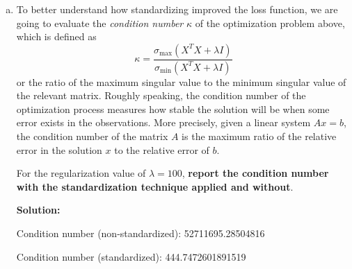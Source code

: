 \documentclass{article}
\newenvironment{solution}{\color{blue} \smallskip \textbf{Solution:}}{}
\begin{document}
\begin{enumerate}[(a)]
\begin{solution}
  Explanation: The regularization parameter \(\lambda\) plays a crucial role in controlling the trade-off between bias and variance in ridge regression. At low values of \(\lambda\), the model fits the training data more closely, resulting in low bias but high variance, as it becomes prone to overfitting by capturing noise in the data. As \(\lambda\) increases, the regularization becomes stronger, which constrains the model coefficients, simplifying the model. This helps reduce variance by preventing overfitting, but at the cost of increasing bias, as the model may become too simple to capture the underlying patterns in the data. At very high values of \(\lambda\), the model can become too rigid, leading to high bias and low variance, resulting in underfitting, where the model fails to capture important trends. Therefore, \(\lambda\) needs to be chosen carefully to strike a balance between bias and variance, with moderate values typically leading to better generalization by reducing overfitting without introducing excessive bias.

  
  
    \end{solution}

    \newpage
    \item To better understand how standardizing improved the loss function, we are going to evaluate the \emph{condition number} $\kappa$ of the optimization problem above, which is defined as
    \[\kappa = \frac{\sigma_{\mbox{max}}(X^TX+\lambda I)}{\sigma_{\mbox{min}}(X^TX+\lambda I)}\]
    or the ratio of the maximum singular value to the minimum singular value of the relevant matrix. Roughly speaking, the condition number of the optimization process measures how stable the solution will be when some error exists in the observations. More precisely, given a linear system $Ax=b$, the condition number of the matrix $A$ is the maximum ratio of the relative error in the solution $x$ to the relative error of $b$.
    
    For the regularization value of $\lambda = 100$, {\bf report the condition number with the standardization technique applied and without}. 
    
    \begin{solution}
        
Condition number (non-standardized): 52711695.28504816

Condition number (standardized): 444.7472601891519
        
    \end{solution}

\end{enumerate}
\end{document}
